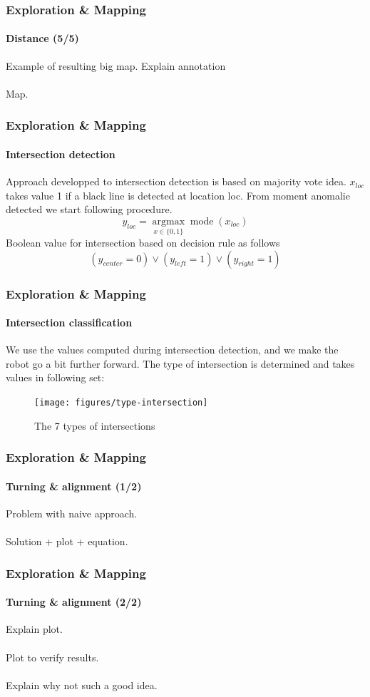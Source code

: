 \documentclass[10pt]{beamer}
\begin{document}

\begin{frame}
\frametitle{Exploration \& Mapping}
\framesubtitle{Distance (5/5)}
Example of resulting big map. Explain annotation\\~\\
Map.
\end{frame}


\begin{frame}
\frametitle{Exploration \& Mapping}
\framesubtitle{Intersection detection}
Approach developped to intersection detection is based on majority vote idea. $x_{loc}$ takes value 1 if a black line is detected at location loc. From moment anomalie detected we start following procedure.
$$
y_{loc} = \underset{x \in  \{0,1\}}{\operatorname{argmax}} \operatorname{mode}(x_{loc})
$$
Boolean value for intersection based on decision rule as follows
$$
(y_{center} = 0) \lor (y_{left} = 1) \lor (y_{right} = 1) 
$$
\end{frame}


\begin{frame}
\frametitle{Exploration \& Mapping}
\framesubtitle{Intersection classification}
We use the values computed during intersection detection, and we make the robot go a bit further forward. The type of intersection is determined and takes values in following set:
\begin{figure}[hbtp]
\centering
\label{fig:type-intersection}
\texttt{[image: figures/type-intersection]}
\caption{The 7 types of intersections}
\end{figure}
\end{frame}


\begin{frame}
\frametitle{Exploration \& Mapping}
\framesubtitle{Turning \& alignment (1/2)}
Problem with naive approach.\\~\\
Solution + plot + equation.
\end{frame}


\begin{frame}
\frametitle{Exploration \& Mapping}
\framesubtitle{Turning \& alignment (2/2)}
Explain plot.\\~\\
Plot to verify results.\\~\\
Explain why not such a good idea.
\end{frame}
\end{document}
